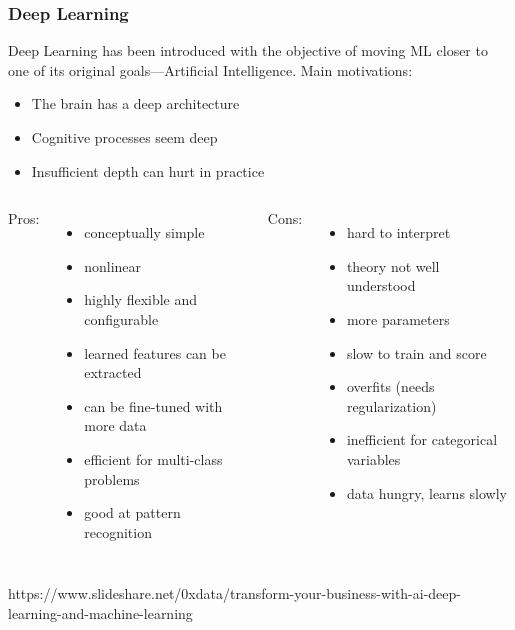 \begin{frame}
  \MyLogo
  \frametitle{Deep Learning}  

\small

\begin{mdframed}[style=mystyle2]
Deep Learning has been introduced with the objective of moving ML closer to one of its original goals---\alert{Artificial Intelligence}. Main motivations:
%
\begin{itemize}\scriptsize\setlength\itemsep{0.1em}
\item The brain has a deep architecture
\item Cognitive processes seem deep
\item Insufficient depth can hurt in practice
\end{itemize}
\end{mdframed}

\medskip
\pause

\begin{columns}

{\color{blue}Pros:}
\begin{itemize}\setlength\itemsep{0.15em}
\item conceptually simple
\item nonlinear 
\item highly flexible and configurable
\item learned features can be extracted
\item can be fine-tuned with more data
\item efficient for multi-class problems
\item good at pattern recognition
\end{itemize}

{\color{red}Cons:}
\begin{itemize}\setlength\itemsep{0.15em}
\item hard to interpret 
\item theory not well understood
\item more parameters
\item slow to train and score
\item overfits (needs regularization)
\item inefficient for categorical variables
\item data hungry, learns slowly 
\end{itemize}
\end{columns}

\begin{center}
{\color{red} \scriptsize
https://www.slideshare.net/0xdata/transform-your-business-with-ai-deep-learning-and-machine-learning}
\end{center}

\end{frame}

